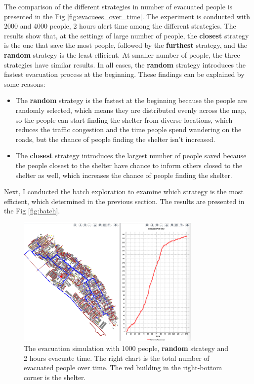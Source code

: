 \documentclass[12pt]{article}
\begin{document}
The comparison of the different strategies in number of evacuated people is presented in the Fig \ref{fig:evacuees_over_time}. The experiment is conducted with 2000 and 4000 people, 2 hours alert time among the different strategies. The results show that, at the settings of large number of people, the \textbf{closest} strategy is the one that save the most people, followed by the \textbf{furthest} strategy, and the \textbf{random} strategy is the least efficient. At smaller number of people, the three strategies have similar results. In all cases, the \textbf{random} strategy introduces the fastest evacuation process at the beginning. These findings can be explained by some reasons:
\begin{itemize}
    \item The \textbf{random} strategy is the fastest at the beginning because the people are randomly selected, which means they are distributed evenly across the map, so the people can start finding the shelter from diverse locations, which reduces the traffic congestion and the time people spend wandering on the roads, but the chance of people finding the shelter isn't increased.
    \item The \textbf{closest} strategy introduces the largest number of people saved because the people closest to the shelter have chance to inform others closed to the shelter as well, which increases the chance of people finding the shelter.
\end{itemize}

Next, I conducted the batch exploration to examine which strategy is the most efficient, which determined in the previous section. The results are presented in the Fig \ref{fig:batch}.


\begin{figure}
    \centering
    \includegraphics[width=0.8\textwidth]{../images/single-simulation.png}
    \caption{The evacuation simulation with 1000 people, \textbf{random} strategy and 2 hours evacuate time. The right chart is the total number of evacuated people over time. The red building in the right-bottom corner is the shelter.}
    \label{fig:results-single}
\end{figure}
\end{document}
